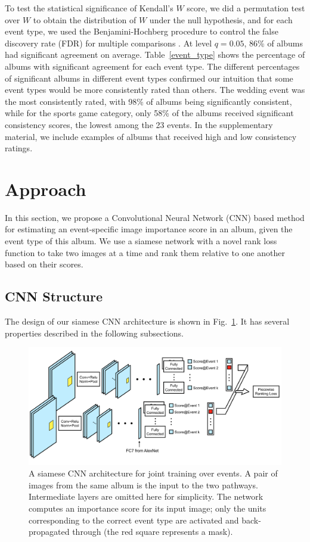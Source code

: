 \documentclass[10pt,twocolumn,letterpaper]{article}
\begin{document}
To test the statistical significance of Kendall's $W$ score, we did a permutation test over $W$ to obtain the distribution of $W$ under the null hypothesis, and for each event type, we used the Benjamini-Hochberg procedure to control the false discovery rate (FDR) for multiple comparisons \cite{Benjamini01thecontrol}. At level $q = 0.05$, 86\% of albums had significant agreement on average. Table~\ref{event_type} shows the percentage of albums with significant agreement for each event type. The different percentages of significant albums in different event types confirmed our intuition that some event types would be more consistently rated than others. The wedding event was the most consistently rated, with 98\% of albums being significantly consistent, while for the sports game category, only  58\% of the albums received significant consistency scores,  the lowest among the 23 events.  In the supplementary material, we include examples of albums that received high and low consistency ratings.
\section{Approach}
In this section, we propose a Convolutional Neural Network (CNN) based method for estimating an event-specific image importance score in an album, given the event type of this album. We use a siamese network \cite{siamese} with a novel rank loss function to take two images at a time and rank them relative to one another based on their scores.

\subsection{CNN Structure}
\label{CNN_section}
The design of our siamese CNN architecture is shown in Fig.~\ref{figure1}. It has several properties described in the following subsections.

\begin{figure}[!htb]
\begin{center}
\includegraphics[width=6in]{architecture3}
\end{center}
\caption{A siamese CNN architecture for joint training over events. A pair of images from the same album is the input to the two pathways. Intermediate layers are omitted here for simplicity. The network computes an importance score for its input image; only the units corresponding to the correct event type are activated and back-propagated through (the red square represents a mask).}
\label{figure1}
\vspace{-0.15in}
\end{figure}
\end{document}
